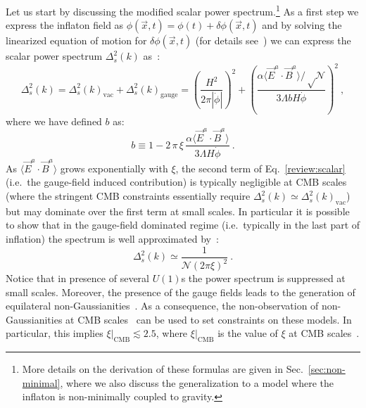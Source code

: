 Let us start by discussing the modified scalar power spectrum.\footnote{More details on the derivation of these formulas are given in Sec.~\ref{sec:non-minimal}, where we also discuss the generalization to a model where the inflaton is non-minimally coupled to gravity.} As a first step we express the inflaton field as $\phi(\vec{x},t)=\phi(t) + \delta \phi(\vec{x},t)$ and by solving the linearized equation of motion for $\delta \phi(\vec{x},t)$ (for details see~\cite{Anber:2006xt,Anber:2009ua,Barnaby:2010vf,Barnaby:2011vw,Barnaby:2011qe}) we can express the scalar power spectrum $\Delta^2_s(k)$ as~\cite{Linde:2012bt,Domcke:2016bkh}:
\begin{equation}
\Delta^2_s(k) = \Delta^2_s(k)_\text{vac} + \Delta^2_s(k)_\text{gauge} = \left(\frac{H^2}{2 \pi |\dot{\phi}|}\right)^2 + \left( \frac{\alpha \langle \vec{E}^a\cdot \vec{B}^a \rangle/ \sqrt\mathcal{N}}{3 \Lambda b H \dot{\phi}} \right)^2 \ ,
\label{review:scalar}
\end{equation}
where we have defined $b$ as:
\begin{equation}
b \equiv 1 - 2 \, \pi \, \xi \,  \frac{\alpha \langle \vec{E}^a \cdot \vec{B}^a \rangle}{3 \Lambda H \dot{\phi}}  \ .
\end{equation} 
As $\langle \vec{E}^a\cdot \vec{B}^a \rangle$ grows exponentially with $\xi$, the second term of Eq.~\eqref{review:scalar} (i.e.\ the gauge-field induced contribution) is typically negligible at CMB scales (where the stringent CMB constraints essentially require $\Delta^2_s(k) \simeq \Delta^2_s(k)_\text{vac}$) but may dominate over the first term at small scales. In particular it is possible to show that in the gauge-field dominated regime (i.e.\ typically in the last part of inflation) the spectrum is well approximated by~\cite{Linde:2012bt,Domcke:2016bkh}:
\begin{equation}
\Delta^2_s(k ) \simeq \frac{1}{\mathcal{N} (2 \pi \xi)^2} \ .
\label{review:scalar_strong}
\end{equation}
Notice that in presence of several $U(1)$s the power spectrum is suppressed at small scales. Moreover, the presence of the gauge fields leads to the generation of equilateral non-Gaussianities~\cite{Anber:2012du}. As a consequence, the non-observation of non-Gaussianities at CMB scales~\cite{Ade:2015lrj,Ade:2015ava} can be used to set constraints on these models. In particular, this implies $\left. \xi\right|_{\text{CMB}} \lesssim 2.5$, where $\left. \xi\right|_{\text{CMB}}$ is the value of $\xi$ at CMB scales~\cite{Barnaby:2011vw,Barnaby:2011qe,Anber:2012du,Barnaby:2010vf,Linde:2012bt}.

